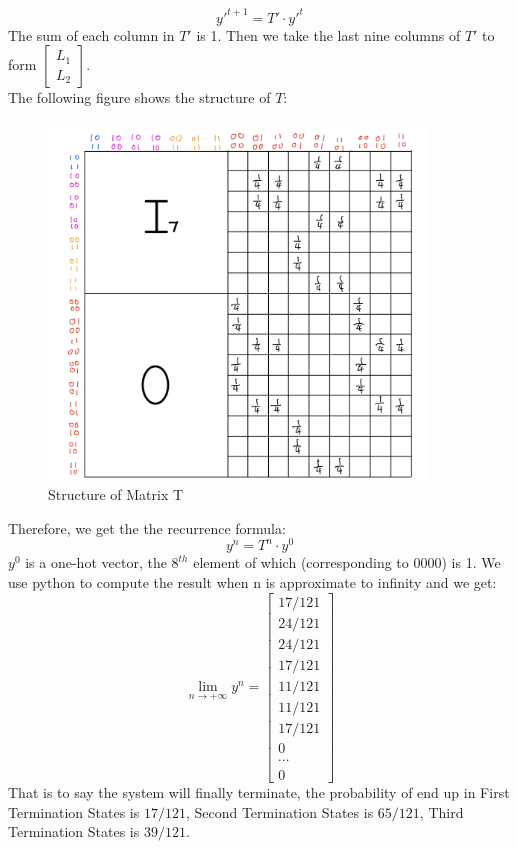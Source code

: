 \documentclass[12pt,a4]{article}
\begin{document}
\begin{solution}
\begin{enumerate}
$$y'^{t+1}=T'\cdot y'^t$$
The sum of each column in $T'$ is 1. Then we take the last nine columns of $T'$ to form $\begin{bmatrix}L_1\\L_2\end{bmatrix}$.\\
The following figure shows the structure of $T$:
    \begin{figure}[htbp]
        \centering
        \includegraphics[width=0.9\textwidth]{figures/T-structure.jpeg}
        \caption{Structure of Matrix T}
    \end{figure}
Therefore, we get the the recurrence formula:
$$y^{n}=T^n\cdot y^0$$
$y^0$ is a one-hot vector, the $8^{th}$ element of which (corresponding to $0000$) is 1.
We use python to compute the result when n is approximate to infinity and we get:
$$\lim\limits_{n\to+\infty}y^n=\begin{bmatrix}17/121\\24/121\\24/121\\17/121\\11/121\\11/121\\17/121\\0\\\cdots\\0\end{bmatrix}$$
That is to say the system will finally terminate, the probability of end up in First Termination States is $17/121$, Second Termination States is $65/121$, Third  Termination States is $39/121$.
  \end{enumerate}
\end{solution}
\end{document}
